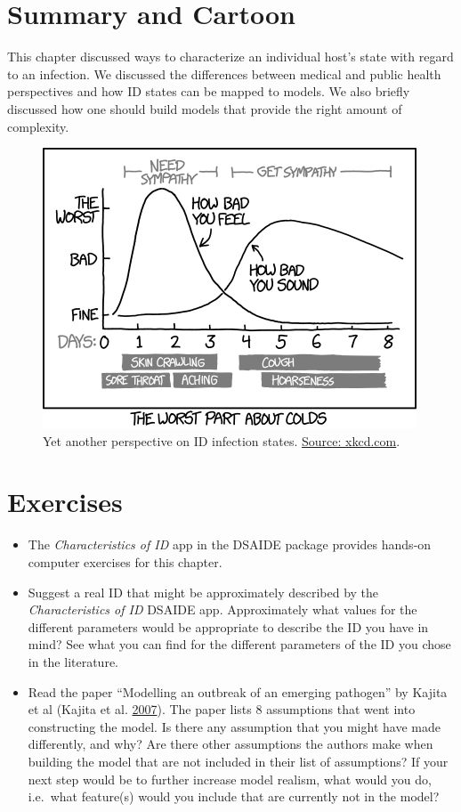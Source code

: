 \documentclass[]{book}
\providecommand{\tightlist}{%
  \setlength{\itemsep}{0pt}\setlength{\parskip}{0pt}}
\theoremstyle{definition}
\theoremstyle{definition}
\theoremstyle{definition}
\theoremstyle{remark}
\begin{document}
\section{Summary and Cartoon}\label{summary-and-cartoon-1}

This chapter discussed ways to characterize an individual host's state
with regard to an infection. We discussed the differences between
medical and public health perspectives and how ID states can be mapped
to models. We also briefly discussed how one should build models that
provide the right amount of complexity.

\begin{figure}
\centering
\includegraphics{./images/xkcd-course-of-colds.png}
\caption{\label{fig:coldcourse}Yet another perspective on ID infection
states. \href{https://xkcd.com/1612/}{Source: xkcd.com}.}
\end{figure}

\section{Exercises}\label{exercises-1}

\begin{itemize}
\tightlist
\item
  The \emph{Characteristics of ID} app in the DSAIDE package provides
  hands-on computer exercises for this chapter.
\item
  Suggest a real ID that might be approximately described by the
  \emph{Characteristics of ID} DSAIDE app. Approximately what values for
  the different parameters would be appropriate to describe the ID you
  have in mind? See what you can find for the different parameters of
  the ID you chose in the literature.
\item
  Read the paper ``Modelling an outbreak of an emerging pathogen'' by
  Kajita et al (Kajita et al. \protect\hyperlink{ref-kajita07}{2007}).
  The paper lists 8 assumptions that went into constructing the model.
  Is there any assumption that you might have made differently, and why?
  Are there other assumptions the authors make when building the model
  that are not included in their list of assumptions? If your next step
  would be to further increase model realism, what would you do,
  i.e.~what feature(s) would you include that are currently not in the
  model?
\end{itemize}
\end{document}
